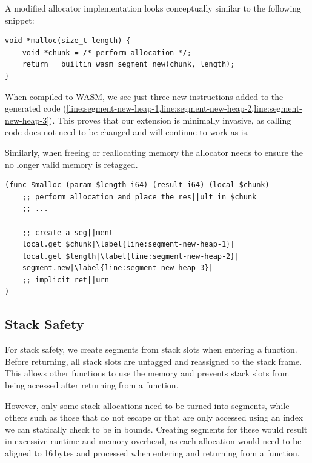A modified allocator implementation looks conceptually similar to the following snippet:

\begin{lstlisting}[frame=h,style=customc,
    label={lst:heap-allocator-example}]
void *malloc(size_t length) {
    void *chunk = /* perform allocation */;
    return __builtin_wasm_segment_new(chunk, length);
}
\end{lstlisting}

When compiled to \ac{WASM}, we see just three new instructions added to the generated code (\cref{line:segment-new-heap-1,line:segment-new-heap-2,line:segment-new-heap-3}).
This proves that our extension is minimally invasive, as calling code does not need to be changed and will continue to work as-is.

Similarly, when freeing or reallocating memory the allocator needs to ensure the no longer valid memory is retagged.

\begin{lstlisting}[frame=h,style=customwasm,
    label={lst:wasm-allocator-example},escapechar=|]
(func $malloc (param $length i64) (result i64) (local $chunk)
    ;; perform allocation and place the res||ult in $chunk
    ;; ...

    ;; create a seg||ment
    local.get $chunk|\label{line:segment-new-heap-1}|
    local.get $length|\label{line:segment-new-heap-2}|
    segment.new|\label{line:segment-new-heap-3}|
    ;; implicit ret||urn
)
\end{lstlisting}

\subsection{Stack Safety}
\label{subsec:stack-safety}

For stack safety, we create segments from stack slots when entering a function.
Before returning, all stack slots are untagged and reassigned to the stack frame.
This allows other functions to use the memory and prevents stack slots from being accessed after returning from a function.

However, only some stack allocations need to be turned into segments, while others such as those that do not escape or that are only accessed using an index we can statically check to be in bounds.
Creating segments for these would result in excessive runtime and memory overhead, as each allocation would need to be aligned to 16\,bytes and processed when entering and returning from a function.

